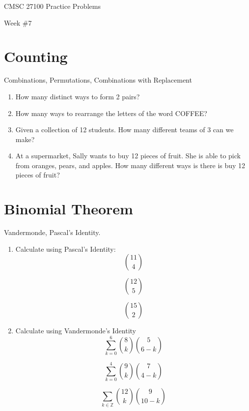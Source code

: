 \documentclass[12pt]{article}
\begin{document}
\hfill CMSC 27100 Practice Problems

\hfill Week \#7

\section*{Counting}
Combinations, Permutations, Combinations with Replacement

\begin{enumerate}
  \item[1.] How many distinct ways to form 2 pairs?
  \item[2.] How many ways to rearrange the letters of the word COFFEE?
  \item[3.] Given a collection of 12 students. How many different teams of 3 can we make?
  \item[4.] At a supermarket, Sally wants to buy 12 pieces of fruit. She is able to pick from oranges, pears, and apples. How many different ways is there is buy 12 pieces of fruit?
\end{enumerate}

\section*{Binomial Theorem}
Vandermonde, Pascal's Identity.

\begin{enumerate}
  \item[1.] Calculate using Pascal's Identity:
  \[
  \binom{11}{4}
  \]

  \[
  \binom{12}{5}
  \]

  \[
  \binom{15}{2}
  \]

  \item[2.] Calculate using Vandermonde's Identity
  \[
  \sum_{k=0}^{6}\binom{8}{k}\binom{5}{6-k}
  \]

  \[
  \sum_{k=0}^{4}\binom{9}{k}\binom{7}{4-k}
  \]

  \[
  \sum_{k\in\mathbb{Z}}\binom{12}{k}\binom{9}{10-k}
  \]
\end{enumerate}
\end{document}
